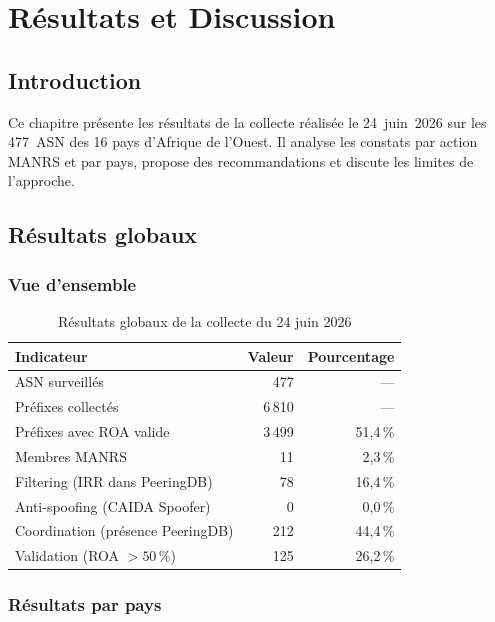 \documentclass{eneam}
\begin{document}
\chapter{Résultats et Discussion}

\section{Introduction}

Ce chapitre présente les résultats de la collecte réalisée le 24~juin~2026 sur les 477~ASN des 16 pays d'Afrique de l'Ouest. Il analyse les constats par action MANRS et par pays, propose des recommandations et discute les limites de l'approche.

\section{Résultats globaux}

\subsection{Vue d'ensemble}

\begin{table}[H]
\caption{Résultats globaux de la collecte du 24 juin 2026}
\centering
\begin{tabular}{|l|r|r|}
\hline
\textbf{Indicateur} & \textbf{Valeur} & \textbf{Pourcentage} \\
\hline
ASN surveillés & 477 & --- \\
\hline
Préfixes collectés & 6\,810 & --- \\
\hline
Préfixes avec ROA valide & 3\,499 & 51,4\,\% \\
\hline
Membres MANRS & 11 & 2,3\,\% \\
\hline
Filtering (IRR dans PeeringDB) & 78 & 16,4\,\% \\
\hline
Anti-spoofing (CAIDA Spoofer) & 0 & 0,0\,\% \\
\hline
Coordination (présence PeeringDB) & 212 & 44,4\,\% \\
\hline
Validation (ROA $>50\,\%$) & 125 & 26,2\,\% \\
\hline
\end{tabular}
\end{table}

\subsection{Résultats par pays}
\end{document}
